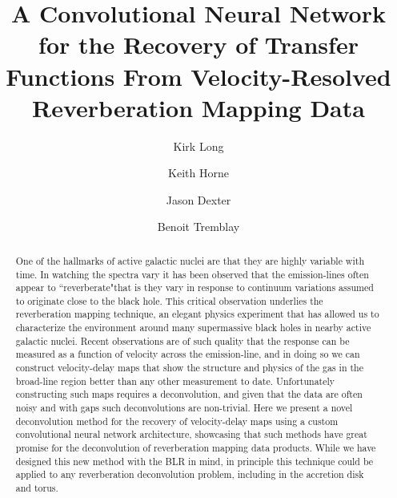 \documentclass[floatfix,twocolumn,trackchanges,linenumbers]{aastex7}
\begin{document}

\title{\vspace{-8mm}A Convolutional Neural Network for the Recovery of Transfer Functions From Velocity-Resolved Reverberation Mapping Data}

\author{Kirk Long}
\author{Keith Horne}
\author{Jason Dexter}
\author{Benoit Tremblay}

\begin{abstract}
One of the hallmarks of active galactic nuclei are that they are highly variable with time. In watching the spectra vary it has been observed that the emission-lines often appear to ``reverberate"\textemdash that is they vary in response to continuum variations assumed to originate close to the black hole. This critical observation underlies the reverberation mapping technique, an elegant physics experiment that has allowed us to characterize the environment around many supermassive black holes in nearby active galactic nuclei. Recent observations are of such quality that the response can be measured as a function of velocity across the emission-line, and in doing so we can construct velocity-delay maps that show the structure and physics of the gas in the broad-line region better than any other measurement to date. Unfortunately constructing such maps requires a deconvolution, and given that the data are often noisy and with gaps such deconvolutions are non-trivial. Here we present a novel deconvolution method for the recovery of velocity-delay maps using a custom convolutional neural network architecture, showcasing that such methods have great promise for the deconvolution of reverberation mapping data products. While we have designed this new method with the BLR in mind, in principle this technique could be applied to any reverberation deconvolution problem, including in the accretion disk and torus.
\end{abstract}
\end{document}
